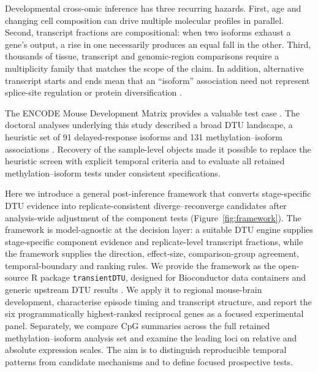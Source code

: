 \documentclass[11pt,a4paper]{article}
\begin{document}
Developmental cross-omic inference has three recurring hazards. First, age and changing cell composition can drive multiple molecular profiles in parallel. Second, transcript fractions are compositional: when two isoforms exhaust a gene's output, a rise in one necessarily produces an equal fall in the other. Third, thousands of tissue, transcript and genomic-region comparisons require a multiplicity family that matches the scope of the claim. In addition, alternative transcript starts and ends mean that an ``isoform'' association need not represent splice-site regulation or protein diversification \citep{reyes2018transcript}.

The ENCODE Mouse Development Matrix provides a valuable test case \citep{encode_expanded_2020,gorkin_atlas_2020,he_mouse_transcriptome_2020,he2020methylome}. The doctoral analyses underlying this study described a broad DTU landscape, a heuristic set of 91 delayed-response isoforms and 131 methylation--isoform associations \citep{gounder_thesis_2025}. Recovery of the sample-level objects made it possible to replace the heuristic screen with explicit temporal criteria and to evaluate all retained methylation--isoform tests under consistent specifications.

Here we introduce a general post-inference framework that converts stage-specific DTU evidence into replicate-consistent diverge--reconverge candidates after analysis-wide adjustment of the component tests (Figure~\ref{fig:framework}). The framework is model-agnostic at the decision layer: a suitable DTU engine supplies stage-specific component evidence and replicate-level transcript fractions, while the framework supplies the direction, effect-size, comparison-group agreement, temporal-boundary and ranking rules. We provide the framework as the open-source R package \texttt{transientDTU}, designed for Bioconductor data containers and generic upstream DTU results \citep{gounder_transientdtu_2026}. We apply it to regional mouse-brain development, characterise episode timing and transcript structure, and report the six programmatically highest-ranked reciprocal genes as a focused experimental panel. Separately, we compare CpG summaries across the full retained methylation--isoform analysis set and examine the leading loci on relative and absolute expression scales. The aim is to distinguish reproducible temporal patterns from candidate mechanisms and to define focused prospective tests.
\end{document}
